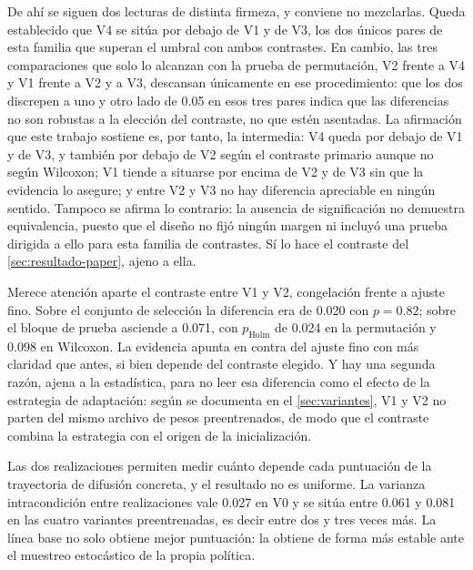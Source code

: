 De ah\'i se siguen dos lecturas de distinta firmeza, y conviene no mezclarlas. Queda
establecido que V4 se sit\'ua por debajo de V1 y de V3, los dos \'unicos pares de esta
familia que superan el umbral con ambos contrastes. En cambio, las tres comparaciones que
solo lo alcanzan con la prueba de permutaci\'on, V2 frente a V4 y V1 frente a V2 y a V3,
descansan \'unicamente en ese procedimiento: que los dos discrepen a uno y otro lado de
\num{0.05} en esos tres pares indica que las diferencias no son robustas a la elecci\'on del
contraste, no que est\'en asentadas. La afirmaci\'on que este trabajo sostiene es, por tanto,
la intermedia: V4 queda por debajo de V1 y de V3, y tambi\'en por debajo de V2 seg\'un el
contraste primario aunque no seg\'un Wilcoxon; V1 tiende a situarse por encima de V2 y de V3
sin que la evidencia lo asegure; y entre V2 y V3 no hay diferencia apreciable en ning\'un
sentido.
Tampoco se afirma lo contrario: la ausencia de significaci\'on no demuestra equivalencia,
puesto que el dise\~no no fij\'o ning\'un margen ni incluy\'o una prueba dirigida a ello para
esta familia de contrastes. S\'i lo hace el contraste del \cref{sec:resultado-paper}, ajeno
a ella.

Merece atenci\'on aparte el contraste entre V1 y V2, congelaci\'on frente a ajuste fino.
Sobre el conjunto de selecci\'on la diferencia era de \num{0.020} con $p = \num{0.82}$;
sobre el bloque de prueba asciende a \num{0.071}, con $p_{\mathrm{Holm}}$ de \num{0.024} en
la permutaci\'on y \num{0.098} en Wilcoxon. La evidencia apunta en contra del ajuste fino
con m\'as claridad que antes, si bien depende del contraste elegido. Y hay una segunda
raz\'on, ajena a la estad\'istica, para no leer esa diferencia como el efecto de la
estrategia de adaptaci\'on: seg\'un se documenta en el \cref{sec:variantes}, V1 y V2 no
parten del mismo archivo de pesos preentrenados, de modo que el contraste combina la
estrategia con el origen de la inicializaci\'on.


Las dos realizaciones permiten medir cu\'anto depende cada puntuaci\'on de la trayectoria de
difusi\'on concreta, y el resultado no es uniforme. La varianza intracondici\'on entre
realizaciones vale \num{0.027} en V0 y se sit\'ua entre \num{0.061} y \num{0.081} en las
cuatro variantes preentrenadas, es decir entre dos y tres veces m\'as. La l\'inea base no
solo obtiene mejor puntuaci\'on: la obtiene de forma m\'as estable ante el muestreo
estoc\'astico de la propia pol\'itica.

